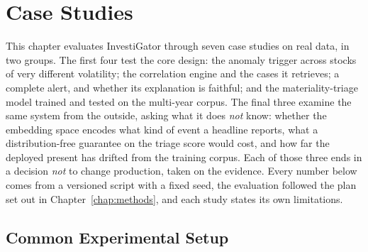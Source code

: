 
\chapter{Case Studies}
\label{chap:casestudies}

This chapter evaluates InvestiGator through seven case studies on real data, in two groups. The first
four test the core design: the anomaly trigger across stocks of very different volatility; the
correlation engine and the cases it retrieves; a complete alert, and whether its explanation is
faithful; and the materiality-triage model trained and tested on the multi-year corpus. The final
three examine the same system from the outside, asking what it does \emph{not} know: whether the
embedding space encodes what kind of event a headline reports, what a distribution-free guarantee on
the triage score would cost, and how far the deployed present has drifted from the training corpus.
Each of those three ends in a decision \emph{not} to change production, taken on the evidence. Every
number below comes from a versioned script with a fixed seed, the evaluation followed the plan set out
in Chapter~\ref{chap:methods}, and each study states its own limitations.

\section{Common Experimental Setup}
\label{sec:cs_setup}

